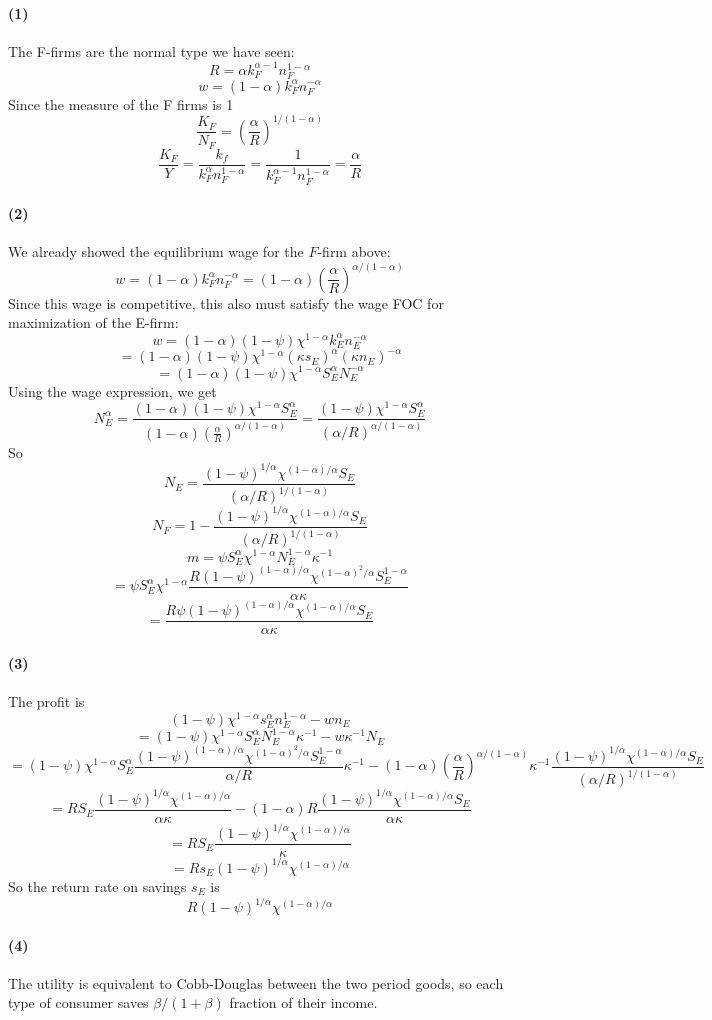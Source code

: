 \documentclass[10pt,letter]{article}
\newcommand{\problempart}[1]{\paragraph{#1}}
\begin{document}
\problempart{(1)}
The F-firms are the normal type we have seen:
\[ R = \alpha k_F^{\alpha - 1}n_F^{1-\alpha} \]
\[ w = (1- \alpha) k_F^{\alpha}n_F^{-\alpha} \]
Since the measure of the F firms is 1
\[ \frac{K_F}{N_F} = \left(\frac{\alpha}{R}\right)^{1/(1-\alpha )} \]
\[ \frac{K_F}{Y} = \frac{k_f}{k_F^{\alpha}n_F^{1-\alpha}} = \frac{1}{k_F^{\alpha-1}n_F^{1-\alpha}} = \frac{\alpha}{R} \]
\problempart{(2)}
We already showed the equilibrium wage for the $F$-firm above:
\[ w = (1- \alpha) k_F^{\alpha}n_F^{-\alpha} = (1-\alpha) \left(\frac{\alpha}{R} \right)^{\alpha/(1-\alpha)}\]
Since this wage is competitive, this also must satisfy the wage FOC for maximization of the E-firm:
\[ w = (1-\alpha)(1-\psi)\chi^{1-\alpha}k_{E}^\alpha n_E^{-\alpha}  \]
\[ = (1-\alpha)(1-\psi)\chi^{1-\alpha}(\kappa s_{E})^\alpha (\kappa n_E)^{-\alpha}  \]
\[ = (1-\alpha)(1-\psi)\chi^{1-\alpha}S_E^\alpha N_E^{-\alpha}  \]
Using the wage expression, we get
\[ N_E^\alpha = \frac{(1-\alpha)(1-\psi)\chi^{1-\alpha}S_E^\alpha}{(1-\alpha) \left(\frac{\alpha}{R} \right)^{\alpha/(1-\alpha)}} = \frac{(1-\psi)\chi^{1-\alpha}S_E^\alpha}{\left(\alpha/R \right)^{\alpha/(1-\alpha)}} \]
So
\[ N_E = \frac{(1-\psi)^{1/\alpha}\chi^{(1-\alpha)/\alpha}S_E}{\left(\alpha/R \right)^{1/(1-\alpha)}} \]
\[ N_F = 1 - \frac{(1-\psi)^{1/\alpha}\chi^{(1-\alpha)/\alpha}S_E}{\left(\alpha/R \right)^{1/(1-\alpha)}} \]
\[ m = \psi S_E^\alpha \chi^{1-\alpha} N_E^{1-\alpha}\kappa^{-1}\]
\[ = \psi S_E^\alpha \chi^{1-\alpha} \frac{R(1-\psi)^{(1-\alpha)/\alpha}\chi^{(1-\alpha)^2/\alpha}S_E^{1-\alpha}}{\alpha \kappa} \]
\[ = \frac{R\psi (1-\psi)^{(1-\alpha)/\alpha}\chi^{(1-\alpha)/\alpha}S_E}{\alpha \kappa} \]
\problempart{(3)}
The profit is
\[ (1-\psi)\chi^{1-\alpha}s_{E}^\alpha n_E^{1-\alpha} - wn_E \]
\[ = (1-\psi)\chi^{1-\alpha}S_{E}^\alpha N_E^{1-\alpha}\kappa^{-1} - w\kappa^{-1}N_E \]
\[ = (1-\psi)\chi^{1-\alpha}S_{E}^\alpha \frac{(1-\psi)^{(1-\alpha)/\alpha}\chi^{(1-\alpha)^2/\alpha}S_E^{1-\alpha}}{\alpha/R }\kappa^{-1} - (1-\alpha) \left(\frac{\alpha}{R} \right)^{\alpha/(1-\alpha)}\kappa^{-1}\frac{(1-\psi)^{1/\alpha}\chi^{(1-\alpha)/\alpha}S_E}{\left(\alpha/R \right)^{1/(1-\alpha)}} \]
\[ = RS_{E} \frac{(1-\psi)^{1/\alpha}\chi^{(1-\alpha)/\alpha}}{\alpha\kappa } - (1-\alpha) R \frac{(1-\psi)^{1/\alpha}\chi^{(1-\alpha)/\alpha}S_E}{\alpha\kappa  } \]
\[ = RS_{E} \frac{(1-\psi)^{1/\alpha}\chi^{(1-\alpha)/\alpha}}{\kappa }  \]
\[ = Rs_{E}(1-\psi)^{1/\alpha}\chi^{(1-\alpha)/\alpha}  \]
So the return rate on savings $s_E$ is
\[ R(1-\psi)^{1/\alpha}\chi^{(1-\alpha)/\alpha} \]
\problempart{(4)}
The utility is equivalent to Cobb-Douglas between the two period goods, so each type of consumer saves $\beta/(1+\beta)$ fraction of their income.
\end{document}
